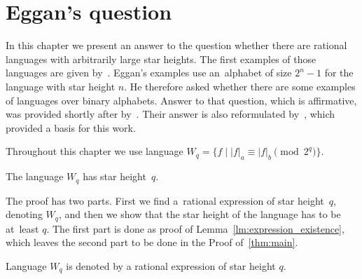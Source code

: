 \chapter{Eggan's question}

In this chapter we present an answer to the question whether there are rational languages with arbitrarily large star heights. The first examples of those languages are given by~\cite{Eggan63}.  Eggan's examples use an~alphabet of size $2^n - 1$ for the language with star height $n$. He therefore asked whether there are some examples of languages over binary alphabets. Answer to that question, which is affirmative, was provided shortly after by~\cite{DejeanSchutzenberger66}. Their answer is also reformulated by~\cite{Sakarovitch09}, which  provided a basis for this work.

Throughout this chapter we use language $W_q = {\{f \mid |f|_a \equiv |f|_b \pmod{2^q} \}}$.

\begin{thm}\label{thm:main}
    The language $W_q$ has star height~$q$.
\end{thm}

The proof has two parts. First we find a~rational expression of star height~$q$, denoting $W_q$, and then we show that the star height of the language has to be at~least $q$. The first part is done as proof of Lemma~\ref*{lm:expression_existence}, which leaves the second part to be done in the Proof of~\autoref*{thm:main}.

\begin{lemma}\label{lm:expression_existence}
    Language $W_q$ is denoted by a rational expression of star height $q$.
\end{lemma}

